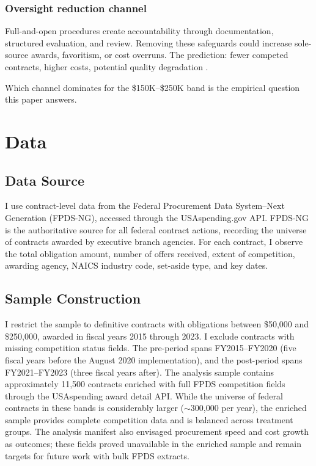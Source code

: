 \documentclass[12pt]{article}
\begin{document}
\subsubsection*{Oversight reduction channel} Full-and-open procedures create accountability through documentation, structured evaluation, and review. Removing these safeguards could increase sole-source awards, favoritism, or cost overruns. The prediction: fewer competed contracts, higher costs, potential quality degradation \citep{spagnolo2012, macleod2011}.

Which channel dominates for the \$150K--\$250K band is the empirical question this paper answers.

\section{Data}

\subsection{Data Source}

I use contract-level data from the Federal Procurement Data System--Next Generation (FPDS-NG), accessed through the USAspending.gov API. FPDS-NG is the authoritative source for all federal contract actions, recording the universe of contracts awarded by executive branch agencies. For each contract, I observe the total obligation amount, number of offers received, extent of competition, awarding agency, NAICS industry code, set-aside type, and key dates.

\subsection{Sample Construction}

I restrict the sample to definitive contracts with obligations between \$50,000 and \$250,000, awarded in fiscal years 2015 through 2023. I exclude contracts with missing competition status fields. The pre-period spans FY2015--FY2020 (five fiscal years before the August 2020 implementation), and the post-period spans FY2021--FY2023 (three fiscal years after). The analysis sample contains approximately 11,500 contracts enriched with full FPDS competition fields through the USAspending award detail API. While the universe of federal contracts in these bands is considerably larger ($\sim$300,000 per year), the enriched sample provides complete competition data and is balanced across treatment groups. The analysis manifest also envisaged procurement speed and cost growth as outcomes; these fields proved unavailable in the enriched sample and remain targets for future work with bulk FPDS extracts.
\end{document}
